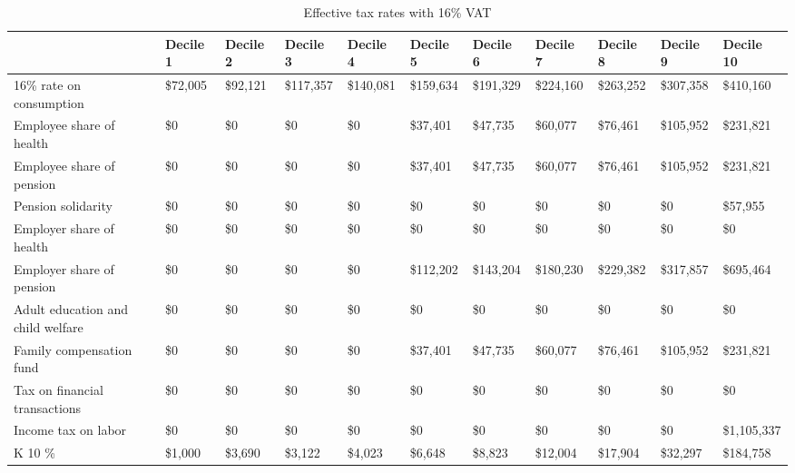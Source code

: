 \documentclass[12pt]{article}
\begin{document}
\begin{landscape}
\begin{table}[]
\caption{Effective tax rates with 16\% VAT}
\label{table:t16}
\footnotesize
\begin{tabular}{lllllllllll} \hline
 &Decile 1                          & Decile 2  & Decile 3  & Decile 4  & Decile 5    & Decile 6    & Decile 7    & Decile 8    & Decile 9    & Decile 10          \\ \hline
16\% rate on consumption          & \$72,005  & \$92,121  & \$117,357 & \$140,081   & \$159,634   & \$191,329   & \$224,160   & \$263,252   & \$307,358   & \$410,160    \\
Employee share of health          & \$0       & \$0       & \$0       & \$0         & \$37,401    & \$47,735    & \$60,077    & \$76,461    & \$105,952   & \$231,821    \\
Employee share of pension         & \$0       & \$0       & \$0       & \$0         & \$37,401    & \$47,735    & \$60,077    & \$76,461    & \$105,952   & \$231,821    \\
Pension solidarity                & \$0       & \$0       & \$0       & \$0         & \$0         & \$0         & \$0         & \$0         & \$0         & \$57,955     \\
Employer share of health          & \$0       & \$0       & \$0       & \$0         & \$0         & \$0         & \$0         & \$0         & \$0         & \$0          \\
Employer share of pension         & \$0       & \$0       & \$0       & \$0         & \$112,202   & \$143,204   & \$180,230   & \$229,382   & \$317,857   & \$695,464    \\
Adult education and child welfare & \$0       & \$0       & \$0       & \$0         & \$0         & \$0         & \$0         & \$0         & \$0         & \$0          \\
Family compensation fund          & \$0       & \$0       & \$0       & \$0         & \$37,401    & \$47,735    & \$60,077    & \$76,461    & \$105,952   & \$231,821    \\
Tax on financial transactions     & \$0       & \$0       & \$0       & \$0         & \$0         & \$0         & \$0         & \$0         & \$0         & \$0          \\
Income tax on labor               & \$0       & \$0       & \$0       & \$0         & \$0         & \$0         & \$0         & \$0         & \$0         & \$1,105,337  \\
K 10 \%                           & \$1,000   & \$3,690   & \$3,122   & \$4,023     & \$6,648     & \$8,823     & \$12,004    & \$17,904    & \$32,297    & \$184,758    \\

\end{tabular}
\end{table}
\end{landscape}
\end{document}
